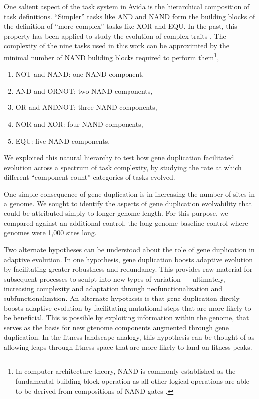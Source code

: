 One salient aspect of the task system in Avida is the hierarchical composition of task definitions.
``Simpler'' tasks like AND and NAND form the building blocks of the definition of ``more complex'' tasks like XOR and EQU.
In the past, this property has been applied to study the evolution of complex traits \citep{TODO}.
The complexity of the nine tasks used in this work can be approximted by the minimal number of NAND buliding blocks required to perform them\footnote{
In computer architecture theory, NAND is commonly established as the fundamental building block operation as all other logical operations are able to be derived from compositions of NAND gates \citep{TODO}.
},
\begin{enumerate}
\item NOT and NAND: one NAND component,
\item AND and ORNOT: two NAND components,
\item OR and ANDNOT: three NAND components,
\item NOR and XOR: four NAND components,
\item EQU: five NAND components.
\end{enumerate}
We exploited this natural hierarchy to test how gene duplication facilitated evolution across a spectrum of task complexity, by studying the rate at which different ``component count'' categories of tasks evolved.

One simple consequence of gene duplication is in increasing the number of sites in a genome.
We sought to identify the aspects of gene duplication evolvability that could be attributed simply to longer genome length.
For this purpose, we compared against an additional control, the long genome baseline control where genomes were 1,000 sites long.

Two alternate hypotheses can be understood about the role of gene duplication in adaptive evolution.
In one hypothesis, gene duplication boosts adaptive evolution by facilitating greater robustness and redundancy.
This provides raw material for subsequent processes to sculpt into new types of variation --- ultimately, increasing complexity and adaptation through  neofunctionalization and subfunctionalization.
An alternate hypothesis is that gene duplication diretly boosts adaptive evolution by facilitating mutational steps that are more likely to be beneficial.
This is possible by exploiting information within the genome, that serves as the basis for new gtenome components augmented through gene duplication.
In the fitness landscape analogy, this hypothesis can be thought of as allowing leaps through fitness space that are more likely to land on fitness peaks.

